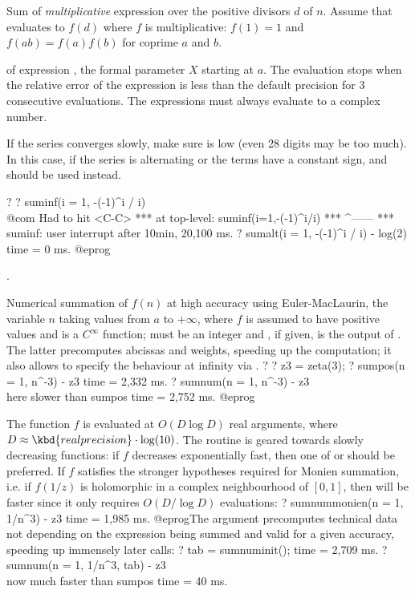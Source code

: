 \label{se:sumdivmult}
Sum of \emph{multiplicative} expression  over the positive
divisors $d$ of $n$. Assume that  evaluates to $f(d)$
where $f$ is multiplicative: $f(1) = 1$ and $f(ab) = f(a)f(b)$ for coprime
$a$ and $b$.

\label{se:suminf}
 of expression
, the formal parameter $X$ starting at $a$. The evaluation stops
when the relative error of the expression is less than the default precision
for 3 consecutive evaluations. The expressions must always evaluate to a
complex number.

If the series converges slowly, make sure  is low (even 28
digits may be too much). In this case, if the series is alternating or the
terms have a constant sign,  and  should be used
instead.

\bprog
? 
? suminf(i = 1, -(-1)^i / i)   \\@com Had to hit <C-C>
  ***   at top-level: suminf(i=1,-(-1)^i/i)
  ***                                ^------
  *** suminf: user interrupt after 10min, 20,100 ms.
? sumalt(i = 1, -(-1)^i / i) - log(2)
time = 0 ms.
@eprog

.

\label{se:sumnum}
Numerical summation of $f(n)$ at high accuracy using Euler-MacLaurin,
the variable $n$ taking values from $a$ to $+\infty$, where $f$ is assumed to
have positive values and is a $C^\infty$ function;  must be an integer
and , if given, is the output of . The latter
precomputes abcissas and weights, speeding up the computation; it also allows
to specify the behaviour at infinity via .
\bprog
? 
? z3 = zeta(3);
? sumpos(n = 1, n^-3) - z3
time = 2,332 ms.
? sumnum(n = 1, n^-3) - z3 \\ here slower than sumpos
time = 2,752 ms.
@eprog

The function $f$ is evaluated at $O(D \log D)$ real arguments,
where $D \approx \kbd{realprecision} \cdot \log(10)$. The routine is geared
towards slowly decreasing functions: if $f$ decreases exponentially fast,
then one of  or  should be preferred.
If $f$ satisfies the stronger hypotheses required for Monien summation,
i.e. if $f(1/z)$ is holomorphic in a complex neighbourhood of $[0,1]$,
then  will be faster since it only requires $O(D/\log D)$
evaluations:
\bprog
? sumnummonien(n = 1, 1/n^3) - z3
time = 1,985 ms.
@eprog\noindent The  argument precomputes technical data
not depending on the expression being summed and valid for a given accuracy,
speeding up immensely later calls:
\bprog
? tab = sumnuminit();
time = 2,709 ms.
? sumnum(n = 1, 1/n^3, tab) - z3 \\ now much faster than sumpos
time = 40 ms.


